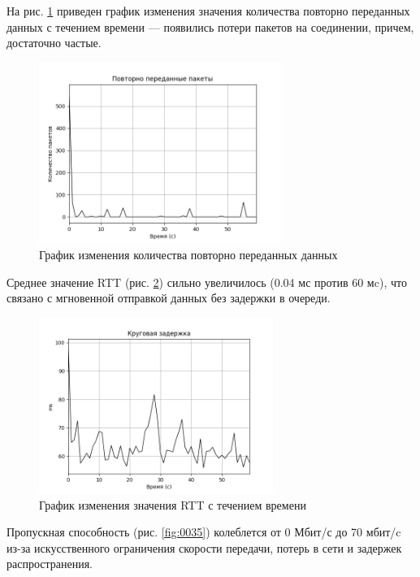 \documentclass[
  13pt,
  fontsize=13pt,
  russian,
  a4paper,
,captions=tableheading
]{scrreprt}
\begin{document}
На рис. \ref{fig:0033} приведен график изменения значения количества
повторно переданных данных с течением времени --- появились потери
пакетов на соединении, причем, достаточно частые.

\begin{figure}
\hypertarget{fig:0033}{%
\centering
\includegraphics[width=0.7\textwidth,height=\textheight]{iproute_retransmits.png}
\caption{График изменения количества повторно переданных
данных}\label{fig:0033}
}
\end{figure}

Среднее значение RTT (рис. \ref{fig:0034}) сильно увеличилось (0.04 мс
против 60 мc), что связано с мгновенной отправкой данных без задержки в
очереди.

\begin{figure}
\hypertarget{fig:0034}{%
\centering
\includegraphics[width=0.68\textwidth,height=\textheight]{iproute_rtt.png}
\caption{График изменения значения RTT с течением
времени}\label{fig:0034}
}
\end{figure}

Пропускная способность (рис. \ref{fig:0035}) колеблется от 0 Мбит/с до
70 мбит/c из-за искусственного ограничения скорости передачи, потерь в
сети и задержек распространения.
\end{document}
